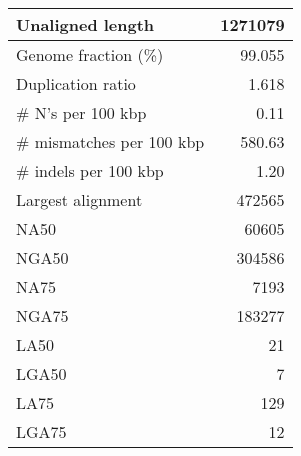 \documentclass[12pt,a4paper]{article}
\begin{document}
\begin{table}[ht]
\begin{center}
\begin{tabular}{|l*{1}{|r}|}
Unaligned length & 1271079 \\ \hline
Genome fraction (\%) & 99.055 \\ \hline
Duplication ratio & 1.618 \\ \hline
\# N's per 100 kbp & 0.11 \\ \hline
\# mismatches per 100 kbp & 580.63 \\ \hline
\# indels per 100 kbp & 1.20 \\ \hline
Largest alignment & 472565 \\ \hline
NA50 & 60605 \\ \hline
NGA50 & 304586 \\ \hline
NA75 & 7193 \\ \hline
NGA75 & 183277 \\ \hline
LA50 & 21 \\ \hline
LGA50 & 7 \\ \hline
LA75 & 129 \\ \hline
LGA75 & 12 \\ \hline
\end{tabular}
\end{center}
\end{table}
\end{document}
